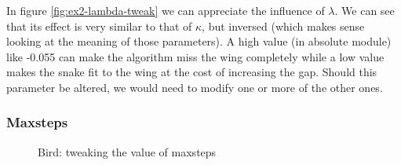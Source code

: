 In figure \ref{fig:ex2-lambda-tweak} we can appreciate the influence of $\lambda$. We can see
that its effect is very similar to that of $\kappa$, but inversed (which makes sense looking at
the meaning of those parameters). A high value (in absolute module) like -0.055 can make the
algorithm miss the wing completely while a low value makes the snake fit to the wing at the cost
of increasing the gap. Should this parameter be altered, we would need to modify one or more
of the other ones.

\subsubsection{Maxsteps}

\begin{figure}[!hbt]
\centering
{}

\caption{Bird: tweaking the value of maxsteps}
\label{fig:ex2-maxsteps-tweak}
\end{figure}

